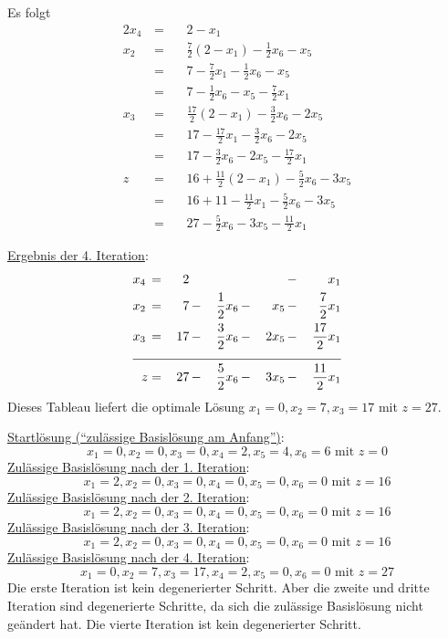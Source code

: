 \documentclass[10pt,a4paper,oneside,ngerman,numbers=noenddot]{scrartcl}
\begin{document}
		Es folgt
		\begin{alignat*}{2}
			x_{4} \,&=&&\, 2 - x_{1} \\
			x_{2} \,&=&&\, \frac{7}{2}\left(2 - x_{1}\right) - \frac{1}{2}x_{6} - x_{5} \\
			&=&&\, 7 - \frac{7}{2}x_{1} - \frac{1}{2}x_{6} - x_{5} \\
			&=&&\, 7 - \frac{1}{2}x_{6} - x_{5} - \frac{7}{2}x_{1} \\
			x_{3} \,&=&&\, \frac{17}{2}\left(2 - x_{1}\right) - \frac{3}{2}x_{6} - 2x_{5} \\
			&=&&\, 17 - \frac{17}{2}x_{1} - \frac{3}{2}x_{6} - 2x_{5} \\
			&=&&\, 17 - \frac{3}{2}x_{6} - 2x_{5} - \frac{17}{2}x_{1} \\
			z \,&=&&\, 16 + \frac{11}{2}\left(2 - x_{1}\right) - \frac{5}{2}x_{6} - 3x_{5}  \\
			&=&&\, 16 + 11 - \frac{11}{2}x_{1} - \frac{5}{2}x_{6} - 3x_{5} \\
			&=&&\, 27 - \frac{5}{2}x_{6} - 3x_{5}  - \frac{11}{2}x_{1}
		\end{alignat*}
		
		\underline{Ergebnis der 4. Iteration}:
		\begin{alignat*}{5}
			x_{4} \,&=&\, 2 \,&& && &-&\, x_{1} \\
			x_{2} \,&=&\, 7 \,&-&\, \frac{1}{2}x_{6} \,&-&\, x_{5} \,&-&\, \frac{7}{2}x_{1} \\
			x_{3} \,&=&\, 17 \,&-&\, \frac{3}{2}x_{6} \,&-&\, 2x_{5} \,&-&\, \frac{17}{2}x_{1} \\ \cline{1 - 9}
			z &=& 27 \,&-&\, \frac{5}{2}x_{6} \,&-&\, 3x_{5} \,&-&\, \frac{11}{2}x_{1}
		\end{alignat*}
		Dieses Tableau liefert die optimale Lösung $x_{1} = 0, x_{2} = 7, x_{3} = 17$ mit $z = 27$.
		
		\underline{Startlösung ("`zulässige Basislösung am Anfang"')}:
		\[
			x_{1} = 0, x_{2} = 0, x_{3} = 0, x_{4} = 2, x_{5} = 4, x_{6} = 6  \text{ mit } z = 0
		\]
		\underline{Zulässige Basislösung nach der 1. Iteration}:
		\[
			x_{1} = 2, x_{2} = 0, x_{3} = 0, x_{4} = 0, x_{5} = 0, x_{6} = 0 \text{ mit } z = 16
		\]
		\underline{Zulässige Basislösung nach der 2. Iteration}:
		\[
			x_{1} = 2, x_{2} = 0, x_{3} = 0, x_{4} = 0, x_{5} = 0, x_{6} = 0 \text{ mit } z = 16
		\]
		\underline{Zulässige Basislösung nach der 3. Iteration}:
		\[
			x_{1} = 2, x_{2} = 0, x_{3} = 0, x_{4} = 0, x_{5} = 0, x_{6} = 0 \text{ mit } z = 16
		\]
		\underline{Zulässige Basislösung nach der 4. Iteration}:
		\[
			x_{1} = 0, x_{2} = 7, x_{3} = 17, x_{4} = 2, x_{5} = 0, x_{6} = 0 \text{ mit } z = 27
		\]
		Die erste Iteration ist kein degenerierter Schritt. Aber die zweite und dritte Iteration sind degenerierte Schritte, da sich die zulässige Basislösung nicht geändert hat. Die vierte Iteration ist kein degenerierter Schritt.
\end{document}

